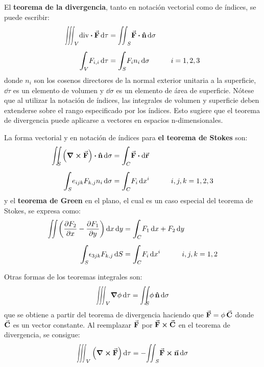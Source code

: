 \documentclass[hidelinks,12pt]{article}
\def\scaleint#1{\vcenter{\hbox{\scaleto[3ex]{\displaystyle\int}{#1}}}}
\def\scaleiint#1{\vcenter{\hbox{\scaleto[3ex]{\displaystyle\iint}{#1}}}}
\def\scaleiiint#1{\vcenter{\hbox{\scaleto[3ex]{\displaystyle\iiint}{#1}}}}
\def\bs{\mkern-12mu}
\begin{document}
El \textbf{teorema de la divergencia}, tanto en notación vectorial como de índices, se puede escribir:
\begin{align}
\begin{aligned}
\scaleiiint{6ex}_{V} \text{div} \vdot \va{F} \dd{\tau} &= \scaleiint{6ex}_{S} \va{F} \vdot \vu{n} \dd{\sigma} \\[0.5em]
\scaleint{6ex}_{\bs V} F_{i, i} \dd{\tau} &= \scaleint{6ex}_{\bs S} F_{i} n_{i} \dd{\sigma} \hspace{1cm} i = 1, 2, 3
\end{aligned}
\label{eq:ecuacion_01_01_16}
\end{align}
donde $n_{i}$ son los cosenos directores de la normal exterior unitaria a la superficie, $\dd{\tau}$ es un elemento de volumen y $\dd{\sigma}$ es un elemento de área de superficie. Nótese que al utilizar la notación de índices, las integrales de volumen y superficie deben extenderse sobre el rango especificado por los índices. Esto sugiere que el teorema de divergencia puede aplicarse a vectores en espacios n-dimensionales.
\par
La forma vectorial y en notación de índices para \textbf{el teorema de Stokes} son:
\begin{align}
\begin{aligned}
\scaleiint{6ex}_{\bs S} \left( \curl{\va{F}} \right) \vdot \vu{n} \dd{\sigma} &= \scaleint{6ex}_{\bs C} \va{F} \vdot \dd{\va{r}} \\[0.5em]
\scaleint{6ex}_{\bs S} e_{ijk} F_{k,j} n_{i} \dd{\sigma} &= \scaleint{6ex}_{\bs C} F_{i} \dd{x^{i}} \hspace{1cm} i, j, k = 1, 2, 3
\end{aligned}
\label{eq:ecuacion_01_01_17}
\end{align}
y el \textbf{teorema de Green} en el plano, el cual es un caso especial del teorema de Stokes, se expresa como:
\begin{align}
\begin{aligned}
\scaleiint{6ex} \left( \pdv{F_{2}}{x} - \pdv{F_{1}}{y} \right) \dd{x} \dd{y} &= \scaleint{6ex}_{\bs C} F_{1} \dd{x} + F_{2} \dd{y} \\[0.5em]
\scaleint{6ex}_{\bs S} \epsilon_{3jk} F_{k,j} \dd{S} &= \scaleint{6ex}_{\bs C} F_{i} \dd{x^{i}} \hspace{1cm} i, j, k = 1, 2
\end{aligned}
\label{eq:ecuacion_01_01_18}
\end{align}

Otras formas de los teoremas integrales son:
\begin{align*}
\scaleiiint{6ex}_{V} \gradient{\phi} \dd{\tau} = \scaleiint{6ex}_{\bs S} \phi \, \vu{n} \dd{\sigma}
\end{align*}
que se obtiene a partir del teorema de divergencia haciendo que $\va{F} = \phi \, \va{C}$ donde $\va{C}$ es un vector constante. Al reemplazar $\va{F}$ por $\va{F} \cross \va{C}$ en el teorema de divergencia, se consigue:
\begin{align*}
\scaleiiint{6ex}_{V} \left( \curl{\va{F}} \right) \dd{\tau} = - \scaleiint{6ex}_{S} \va{F} \cross \va{n} \dd{\sigma}
\end{align*}
\end{document}
